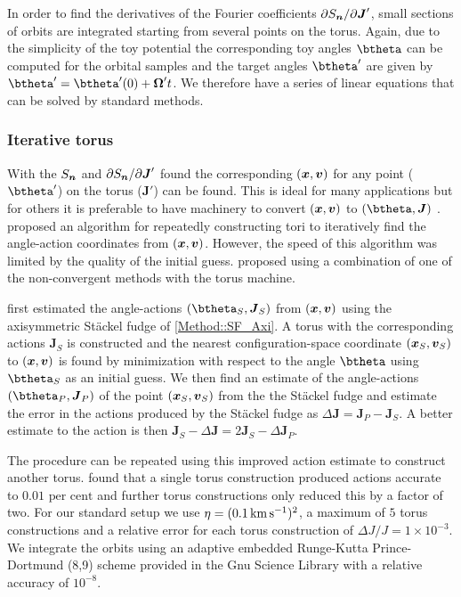 \documentclass[useAMS,usenatbib,fleqn,a4paper]{mn2e}
\def\kms{\,{\rm km\,s^{-1}}}
\def\percent{\text{ per cent}}
\newcommand{\bs}[1]{\bmath{#1}}
\def\percent{\text{ per cent}}
\begin{document}
In order to find the derivatives of the Fourier coefficients $\partial S_{\bs{n}}/\partial \bs{J}'$, small sections of orbits are integrated starting from several points on the torus. Again, due to the simplicity of the toy potential the corresponding toy angles $\btheta$ can be computed for the orbital samples and the target angles $\btheta'$ are given by $\btheta'=\btheta'(0)+\boldsymbol{\Omega}'t$. We therefore have a series of linear equations that can be solved by standard methods.

\subsubsection{Iterative torus}\label{Method::ItTorus}
With the $S_{\bs{n}}$ and $\partial S_{\bs{n}}/\partial \bs{J}'$ found the corresponding $(\bs{x},\bs{v})$ for any point ($\btheta'$) on the torus ($\boldsymbol{J}'$) can be found. This is ideal for many applications but for others it is preferable to have machinery to convert $(\bs{x},\bs{v})$ to $(\btheta,\boldsymbol{J})$ \citep{McMillanBinney2013}. \cite{McMillanBinney2008} proposed an algorithm for repeatedly constructing tori to iteratively find the angle-action coordinates from $(\bs{x},\bs{v})$. However, the speed of this algorithm was limited by the quality of the initial guess. \cite{SandersBinney2015} proposed using a combination of one of the non-convergent methods with the torus machine.

\cite{SandersBinney2015} first estimated the angle-actions $(\btheta_S,\boldsymbol{J}_S)$ from $(\bs{x},\bs{v})$ using the axisymmetric St\"ackel fudge of \ref{Method::SF_Axi}. A torus with the corresponding actions $\boldsymbol{J}_S$ is constructed and the nearest configuration-space coordinate $(\bs{x}_S,\bs{v}_S)$ to $(\bs{x},\bs{v})$ is found by minimization with respect to the angle $\btheta$ using $\btheta_S$ as an initial guess. We then find an estimate of the angle-actions $(\btheta_P,\boldsymbol{J}_P)$ of the point $(\bs{x}_S,\bs{v}_S)$ from the the St\"ackel fudge and estimate the error in the actions produced by the St\"ackel fudge as $\Delta\boldsymbol{J}=\boldsymbol{J}_P-\boldsymbol{J}_S$. A better estimate to the action is then $\boldsymbol{J}_S-\Delta\boldsymbol{J}=2\boldsymbol{J}_S-\Delta\boldsymbol{J}_P$.

The procedure can be repeated using this improved action estimate to construct another torus. \cite{SandersBinney2015} found that a single torus construction produced actions accurate to $0.01\percent$ and further torus constructions only reduced this by a factor of two. For our standard setup we use $\eta=(0.1\kms)^2$, a maximum of $5$ torus constructions and a relative error for each torus construction of $\Delta J/J=1\times10^{-3}$. We integrate the orbits using an adaptive embedded Runge-Kutta Prince-Dortmund (8,9) scheme provided in the Gnu Science Library \citep{GSL} with a relative accuracy of $10^{-8}$.
\end{document}
